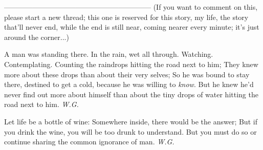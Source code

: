 --------------------------------------------------------------
(If you want to comment on this, please start a new thread; this one is reserved for this story, my life, the story that'll never end, while the end is still near, coming nearer every minute; it's just around the corner...)

A man was standing there. 
In the rain, wet all through. 
Watching. 
Contemplating. 
Counting the raindrops hitting the road 
next to him; 
They knew more about these drops 
than about their very selves; 
So he was bound to stay there, 
destined to get a cold, 
because he was willing to \emph{know}. 
But he knew he'd never find out 
more about himself 
than about the tiny drops of water 
hitting the road 
next to him. 
\emph{W.G.}

Let life be a bottle of wine: 
Somewhere inside, there would be 
the answer; 
But if you drink the wine, 
you will be too drunk to understand. 
But you must do so 
or continue sharing 
the common ignorance 
of man. 
\emph{W.G.}
